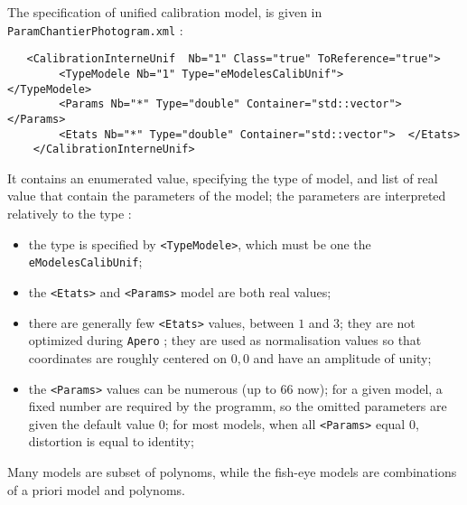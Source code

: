The specification of  unified calibration model, is given in
{\tt ParamChantierPhotogram.xml} :

\begin{verbatim}
   <CalibrationInterneUnif  Nb="1" Class="true" ToReference="true">
        <TypeModele Nb="1" Type="eModelesCalibUnif">          </TypeModele>
        <Params Nb="*" Type="double" Container="std::vector"> </Params>
        <Etats Nb="*" Type="double" Container="std::vector">  </Etats>
    </CalibrationInterneUnif>
\end{verbatim}

It contains an enumerated value, specifying the type of model, and
list of real value that contain the parameters of the model; the parameters
are interpreted relatively to the type :


\begin{itemize}
     \item the type is specified by {\tt <TypeModele>}, which must be one the {\tt eModelesCalibUnif};

     \item the {\tt <Etats>} and {\tt <Params>} model are both real values;

     \item there are generally few {\tt <Etats>} values, between $1$ and $3$;  they are not
           optimized during {\tt Apero} ; they are used as normalisation values so that coordinates
           are roughly centered on $0,0$ and have an amplitude of unity;

     \item the {\tt <Params>} values can be numerous (up to $66$ now);
           for a given model, a fixed number are required by the programm, so
           the omitted parameters are given the default value $0$; for most models,
            when all {\tt <Params>} equal $0$, distortion is equal to identity;
\end{itemize}

Many models are subset of polynoms, while the fish-eye models are combinations
of a priori model and polynoms.


